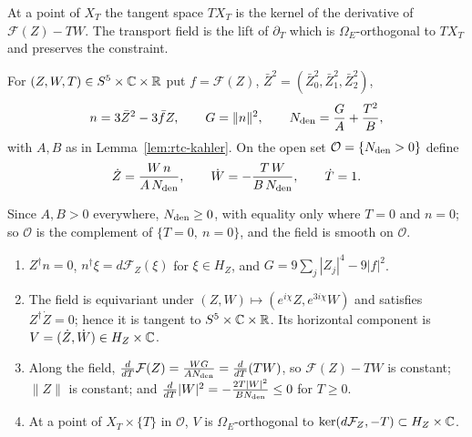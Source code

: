 At a point of $X_T$ the tangent space $TX_T$ is the kernel of the derivative of $\mathcal F(Z)-TW$. The transport field is
the lift of $\partial_T$ which is $\Omega_E$-orthogonal to $TX_T$ and preserves the constraint.

\begin{construction}\label{cons:rtc-transport}
For $(Z,W,T)\in S^5\times\mathbb{C}\times\mathbb{R}$ put $f=\mathcal F(Z)$, $\bar Z^2=(\bar Z_0^2,\bar Z_1^2,\bar Z_2^2)$,
\[
 n=3\bar Z^2-3\bar fZ,\qquad G=\|n\|^2,\qquad N_{\rm den}=\frac GA+\frac{T^2}B ,
\]
with $A,B$ as in Lemma~\ref{lem:rtc-kahler}. On the open set $\mathcal O=\{N_{\rm den}>0\}$ define
\begin{equation}\label{eq:rtc-transport}
 \dot Z=\frac{W\,n}{A\,N_{\rm den}},\qquad \dot W=-\frac{T\,W}{B\,N_{\rm den}},\qquad \dot T=1 .
\end{equation}
\end{construction}

Since $A,B>0$ everywhere, $N_{\rm den}\ge0$, with equality only where $T=0$ and $n=0$; so $\mathcal O$ is the complement of
$\{T=0,\ n=0\}$, and the field is smooth on $\mathcal O$.

\begin{lemma}\label{lem:rtc-transport-field}
\begin{enumerate}[label=(\roman*)]
\item $Z^\dagger n=0$, $n^\dagger\xi=d\mathcal F_Z(\xi)$ for $\xi\in H_Z$, and $G=9\sum_j|Z_j|^4-9|f|^2$.
\item The field is equivariant under $(Z,W)\mapsto(e^{i\chi}Z,e^{3i\chi}W)$ and satisfies $Z^\dagger\dot Z=0$; hence it is
tangent to $S^5\times\mathbb{C}\times\mathbb{R}$. Its horizontal component is $V=(\dot Z,\dot W)\in H_Z\times\mathbb{C}$.
\item Along the field, $\frac{d}{dT}\mathcal F(Z)=\frac{WG}{AN_{\rm den}}=\frac{d}{dT}(TW)$, so $\mathcal F(Z)-TW$ is constant;
$\|Z\|$ is constant; and $\frac{d}{dT}|W|^2=-\frac{2T|W|^2}{BN_{\rm den}}\le0$ for $T\ge0$.
\item At a point of $X_T\times\{T\}$ in $\mathcal O$, $V$ is $\Omega_E$-orthogonal to $\ker(d\mathcal F_Z,-T)\subset H_Z\times\mathbb{C}$.
\end{enumerate}
\end{lemma}

